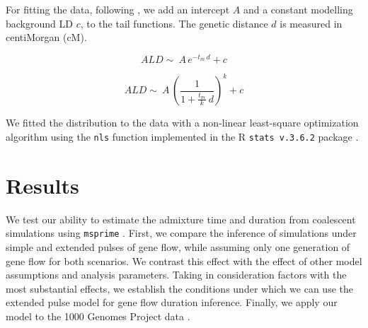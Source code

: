 \documentclass[]{article}
\begin{document}
For fitting the data, following \cite{moorjani_genetic_2016}, we add an intercept $A$ and a constant modelling background LD $c$, to the tail functions. The genetic distance $d$ is measured in centiMorgan (cM).


\begin{equation}
\label{eq:simple_pulse_tail_inf}
ALD \sim\ A\,e^{-t_m \:d}+c
\end{equation}

\begin{equation}
\label{eq:extended_pulse_tail_inf}
ALD \sim\ A\,\left( \frac{1}{1 + \frac{t_m}{k} \:d}\right) ^k+c
\end{equation}

We fitted the distribution to the data with  a non-linear least-square optimization algorithm
using the \texttt{nls} function implemented in the R \texttt{stats v.3.6.2} package \citep{R_Core_Team_2019}.

\section{Results}\label{results}


We test our ability to estimate the admixture time and duration from coalescent simulations using \texttt{msprime} \citep{kelleher_efficient_2016}. First, we compare the inference of simulations under simple and extended pulses of gene flow, while assuming only one generation of gene flow for both scenarios. We contrast this effect with the effect of other model assumptions and analysis parameters. Taking in consideration factors with the most substantial effects, we establish the conditions under which we can use the extended pulse model for gene flow duration inference. Finally, we apply our model to the 1000 Genomes Project data \citep{the_1000_genomes_project_consortium_global_2015}.
\end{document}
